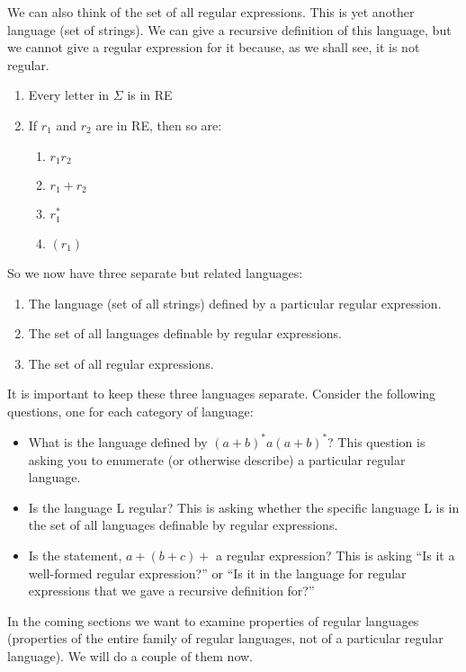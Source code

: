 \documentclass[letterpaper,12pt,openany,reqno]{book}%
\begin{document}
We can also think of the set of all regular expressions. This is yet another language (set of strings). We can give a recursive definition of this language, but we cannot give a regular expression for it because, as we shall see, it is not regular.

\begin{enumerate}
\item Every letter in $\Sigma$ is in RE
\item If $r_1$ and $r_2$ are in RE, then so are:
\begin{enumerate}
\item $r_1 r_2$
\item $r_1 + r_2$
\item $r_1^*$
\item $(r_1)$
\end{enumerate}
\end{enumerate}

So we now have three separate but related languages:
\begin{enumerate}
\item The language (set of all strings) defined by a particular regular expression.
\item The set of all languages definable by regular expressions.
\item The set of all regular expressions.
\end{enumerate}

It is important to keep these three languages separate. Consider the following questions, one for each category of language:
\begin{itemize}
\item What is the language defined by $(a + b)^*a(a + b)^*$? This question is asking you to enumerate (or otherwise describe) a particular regular language.
\item Is the language L regular? This is asking whether the specific language L is in the set of all languages definable by regular expressions.
\item Is the statement, $a + (b + c)+$ a regular expression? This is asking ``Is it a well-formed regular expression?'' or ``Is it in the language for regular expressions that we gave a recursive definition for?''
\end{itemize}

In the coming sections we want to examine properties of regular languages (properties of the entire family of regular languages, not of a particular regular language). We will do a couple of them now.
\end{document}
